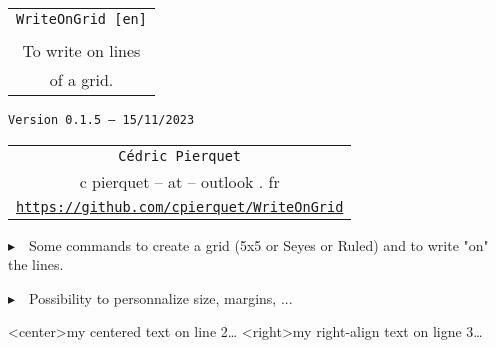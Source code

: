 \documentclass[a4paper]{article}
\def\TPversion{0.1.5}
\def\TPdate{15/11/2023}
\begin{document}
\pagestyle{fancy}

\thispagestyle{empty}

\vspace{2cm}

\begin{center}
	\begin{minipage}{0.75\linewidth}
	\begin{tcolorbox}[colframe=yellow,colback=yellow!15]
		\begin{center}
			\begin{tabular}{c}
				{\Huge \texttt{WriteOnGrid [en]}}\\
				\\
				{\LARGE To write on lines} \\
				{\LARGE of a grid.}
			\end{tabular}
			
			\medskip
			
			{\small \texttt{Version \TPversion{} -- \TPdate}}
		\end{center}
	\end{tcolorbox}
\end{minipage}
\end{center}

\vspace{0.5cm}

\begin{center}
	\begin{tabular}{c}
	\texttt{Cédric Pierquet}\\
	{\ttfamily c pierquet -- at -- outlook . fr}\\
	\texttt{\url{https://github.com/cpierquet/WriteOnGrid}}
\end{tabular}
\end{center}

\vspace{0.5cm}

{$\blacktriangleright$~~Some commands to create a grid (5x5 or Seyes or Ruled) and to write "on" the lines.}

\smallskip

{$\blacktriangleright$~~Possibility to personnalize size, margins, ...}

\vspace{1cm}

\begin{center}
	\begin{EnvGrid}[NumSquares=22x8]
	\WriteLine<center>{my centered text on line 2\ldots}
	\WriteLine<right>{my right-align text on ligne 3\ldots}
	\PassLine
\end{EnvGrid}
\end{center}
\end{document}
